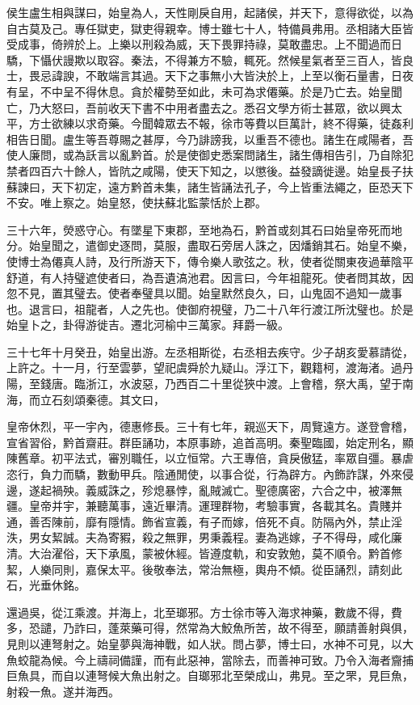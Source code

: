 侯生盧生相與謀曰，始皇為人，天性剛戾自用，起諸侯，并天下，意得欲從，以為自古莫及己。專任獄吏，獄吏得親幸。博士雖七十人，特備員弗用。丞相諸大臣皆受成事，倚辨於上。上樂以刑殺為威，天下畏罪持祿，莫敢盡忠。上不聞過而日驕，下懾伏謾欺以取容。秦法，不得兼方不驗，輒死。然候星氣者至三百人，皆良士，畏忌諱諛，不敢端言其過。天下之事無小大皆決於上，上至以衡石量書，日夜有呈，不中呈不得休息。貪於權勢至如此，未可為求僊藥。於是乃亡去。始皇聞亡，乃大怒曰，吾前收天下書不中用者盡去之。悉召文學方術士甚眾，欲以興太平，方士欲練以求奇藥。今聞韓眾去不報，徐市等費以巨萬計，終不得藥，徒姦利相告日聞。盧生等吾尊賜之甚厚，今乃誹謗我，以重吾不德也。諸生在咸陽者，吾使人廉問，或為訞言以亂黔首。於是使御史悉案問諸生，諸生傳相告引，乃自除犯禁者四百六十餘人，皆阬之咸陽，使天下知之，以懲後。益發謫徙邊。始皇長子扶蘇諫曰，天下初定，遠方黔首未集，諸生皆誦法孔子，今上皆重法繩之，臣恐天下不安。唯上察之。始皇怒，使扶蘇北監蒙恬於上郡。

三十六年，熒惑守心。有墜星下東郡，至地為石，黔首或刻其石曰始皇帝死而地分。始皇聞之，遣御史逐問，莫服，盡取石旁居人誅之，因燔銷其石。始皇不樂，使博士為僊真人詩，及行所游天下，傳令樂人歌弦之。秋，使者從關東夜過華陰平舒道，有人持璧遮使者曰，為吾遺滈池君。因言曰，今年祖龍死。使者問其故，因忽不見，置其璧去。使者奉璧具以聞。始皇默然良久，曰，山鬼固不過知一歲事也。退言曰，祖龍者，人之先也。使御府視璧，乃二十八年行渡江所沈璧也。於是始皇卜之，卦得游徙吉。遷北河榆中三萬家。拜爵一級。

三十七年十月癸丑，始皇出游。左丞相斯從，右丞相去疾守。少子胡亥愛慕請從，上許之。十一月，行至雲夢，望祀虞舜於九疑山。浮江下，觀籍柯，渡海渚。過丹陽，至錢唐。臨浙江，水波惡，乃西百二十里從狹中渡。上會稽，祭大禹，望于南海，而立石刻頌秦德。其文曰，

皇帝休烈，平一宇內，德惠修長。三十有七年，親巡天下，周覽遠方。遂登會稽，宣省習俗，黔首齋莊。群臣誦功，本原事跡，追首高明。秦聖臨國，始定刑名，顯陳舊章。初平法式，審別職任，以立恒常。六王專倍，貪戾傲猛，率眾自彊。暴虐恣行，負力而驕，數動甲兵。陰通閒使，以事合從，行為辟方。內飾詐謀，外來侵邊，遂起禍殃。義威誅之，殄熄暴悖，亂賊滅亡。聖德廣密，六合之中，被澤無疆。皇帝并宇，兼聽萬事，遠近畢清。運理群物，考驗事實，各載其名。貴賤并通，善否陳前，靡有隱情。飾省宣義，有子而嫁，倍死不貞。防隔內外，禁止淫泆，男女絜誠。夫為寄豭，殺之無罪，男秉義程。妻為逃嫁，子不得母，咸化廉清。大治濯俗，天下承風，蒙被休經。皆遵度軌，和安敦勉，莫不順令。黔首修絜，人樂同則，嘉保太平。後敬奉法，常治無極，輿舟不傾。從臣誦烈，請刻此石，光垂休銘。

還過吳，從江乘渡。并海上，北至瑯邪。方士徐市等入海求神藥，數歲不得，費多，恐譴，乃詐曰，蓬萊藥可得，然常為大鮫魚所苦，故不得至，願請善射與俱，見則以連弩射之。始皇夢與海神戰，如人狀。問占夢，博士曰，水神不可見，以大魚蛟龍為候。今上禱祠備謹，而有此惡神，當除去，而善神可致。乃令入海者齎捕巨魚具，而自以連弩候大魚出射之。自瑯邪北至榮成山，弗見。至之罘，見巨魚，射殺一魚。遂并海西。

